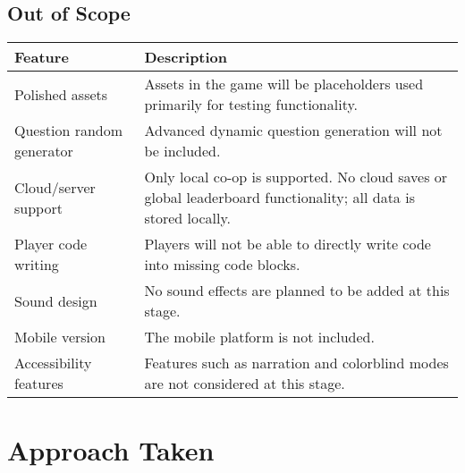 \documentclass{article}
\begin{document}
\subsection*{Out of Scope}

\begin{tabularx}{\textwidth}{|l|X|}
\hline
\textbf{Feature} & \textbf{Description} \\
\hline
Polished assets & Assets in the game will be placeholders used primarily for testing functionality. \\
\hline
Question random generator & Advanced dynamic question generation will not be included. \\
\hline
Cloud/server support & Only local co-op is supported. No cloud saves or global leaderboard functionality; all data is stored locally. \\
\hline
Player code writing & Players will not be able to directly write code into missing code blocks. \\
\hline
Sound design & No sound effects are planned to be added at this stage. \\
\hline
Mobile version & The mobile platform is not included. \\
\hline
Accessibility features & Features such as narration and colorblind modes are not considered at this stage. \\
\hline
\end{tabularx}

\section{Approach Taken}
\end{document}
